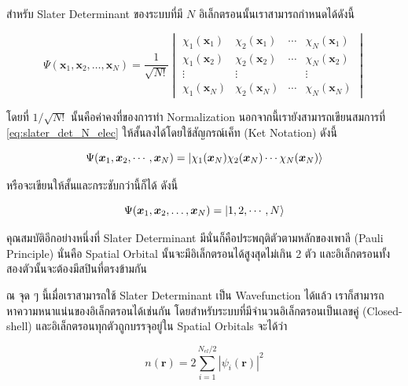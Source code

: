 สำหรับ Slater Determinant ของระบบที่มี $N$ อิเล็กตรอนนั้นเราสามารถกำหนดได้ดังนี้\autocite{szabo1996}

\begin{equation}\label{eq:slater_det_N_elec}
    \Psi(\bm{x}_{1}, \bm{x}_{2}, \dots, \bm{x}_{N}) = 
    \frac{1}{\sqrt{N!}}
    \begin{vmatrix}
        \chi_{1}(\bm{x}_{1}) & \chi_{2}(\bm{x}_{1}) & \cdots & \chi_{N}(\bm{x}_{1}) \\
        \chi_{1}(\bm{x}_{2}) & \chi_{2}(\bm{x}_{2}) & \cdots & \chi_{N}(\bm{x}_{2}) \\
        \vdots & \vdots & & \vdots \\
        \chi_{1}(\bm{x}_{N}) & \chi_{2}(\bm{x}_{N}) & \cdots & \chi_{N}(\bm{x}_{N})
    \end{vmatrix}
\end{equation}

\noindent โดยที่ $1/\sqrt{N!}$ นั้นคือค่าคงที่ของการทำ Normalization นอกจากนี้เรายังสามารถเขียนสมการที่ 
\ref{eq:slater_det_N_elec} ให้สั้นลงได้โดยใช้สัญกรณ์เค็ท (Ket Notation) ดังนี้

\begin{equation}\label{eq:slater_det_ket}
    \Psi(\bm{x}_{1}, \bm{x}_{2}, \cdots, \bm{x}_{N}) = 
    \ket{\chi_{1}(\bm{x}_{N}) \chi_{2}(\bm{x}_{N}) \cdots \chi_{N}(\bm{x}_{N})}
\end{equation}

\noindent หรือจะเขียนให้สั้นและกระชับกว่านี้ก็ได้ ดังนี้

\begin{equation}\label{eq:slater_det_ket_short}
    \Psi(\bm{x}_{1}, \bm{x}_{2}, \dots, \bm{x}_{N}) = 
    \ket{1, 2, \cdots, N}
\end{equation}

คุณสมบัติอีกอย่างหนึ่งที่ Slater Determinant มีนั่นก็คือประพฤติตัวตามหลักของเพาลี (Pauli Principle) นั่นคือ Spatial Orbital 
นั้นจะมีอิเล็กตรอนได้สูงสุดไม่เกิน 2 ตัว และอิเล็กตรอนทั้งสองตัวนั้นจะต้องมีสปินที่ตรงข้ามกัน\autocite{atkins2010}

ณ จุด ๆ นี้เมื่อเราสามารถใช้ Slater Determinant เป็น Wavefunction ได้แล้ว เราก็สามารถหาความหนาแน่นของอิเล็กตรอนได้เช่นกัน
โดยสำหรับระบบที่มีจำนวนอิเล็กตรอนเป็นเลขคู่ (Closed-shell) และอิเล็กตรอนทุกตัวถูกบรรจุอยู่ใน Spatial Orbitals จะได้ว่า

\begin{equation}\label{eq:density_slater}
    n(\bm{r}) = 2 \sum_{i=1}^{N_{el}/2} |\psi_{i}(\bm{r})|^{2}
\end{equation}

